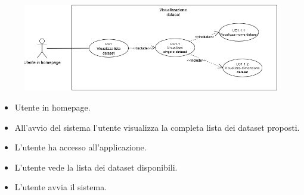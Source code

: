 
    \begin{figure}[h!]
        \centering
        \includegraphics[scale=0.55]{template/images/UC1.png}
        \caption{}
    \end{figure}
    \UCdsc
    { %
        \begin{itemize}
            \item Utente in homepage.
        \end{itemize}
    }
    { %
        \begin{itemize}
            \item All'avvio del sistema l'utente visualizza la completa lista dei dataset proposti.
        \end{itemize}
    }
    { %
        \begin{itemize}
            \item L'utente ha accesso all'applicazione.
        \end{itemize}
    }
    { %
        \begin{itemize}
            \item L'utente vede la lista dei dataset disponibili.
        \end{itemize}
    }
    { %
        \begin{itemize}
            \item L'utente avvia il sistema.
        \end{itemize}
    }


    \newpage

